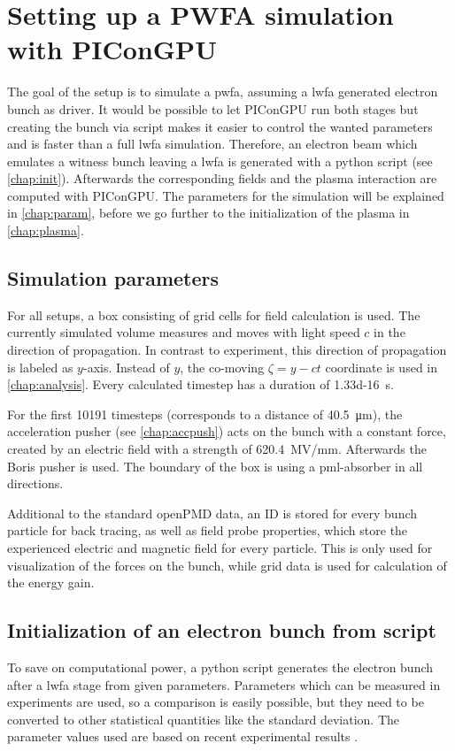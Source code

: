 \documentclass[bachelor_thesis]{subfiles}
\begin{document}
\chapter{Setting up a PWFA simulation with PIConGPU}\label{chap:setup}
The goal of the setup is to simulate a \gls{pwfa}, assuming a \gls{lwfa} generated electron bunch as driver. It would be possible to let PIConGPU run both stages but creating the bunch via script makes it easier to control the wanted parameters and is faster than a full \gls{lwfa} simulation.
Therefore, an electron beam which emulates a witness bunch leaving a \gls{lwfa} is generated with a python script (see \autoref{chap:init}). Afterwards the corresponding fields and the plasma interaction are computed with PIConGPU. 
The parameters for the simulation will be explained in \autoref{chap:param}, before we go further to the initialization of the plasma in \autoref{chap:plasma}.


\section{Simulation parameters}\label{chap:param}
For all setups, a box consisting of  grid cells for field calculation is used. The currently simulated volume measures  and moves with light speed $c$ in the direction of propagation.
In contrast to experiment, this direction of propagation is labeled as $y$-axis. Instead of $y$, the co-moving $\zeta=y-ct$ coordinate is used in \autoref{chap:analysis}.
Every calculated timestep has a duration of \qty{1.33d-16}{\s}. 

For the first \num{10191} timesteps (corresponds to a distance of \qty{40.5}{\um}), the acceleration pusher (see \autoref{chap:accpush}) acts on the bunch with a constant force, 
created by an electric field with a strength of \qty{620.4}{\mega\volt/\mm}. Afterwards the Boris pusher is used. 
The boundary of the box is using a \gls{pml}-absorber in all directions. 

Additional to the standard openPMD data, an ID is stored for every bunch particle for back tracing, as well as field probe properties, which store the experienced electric and magnetic field for every particle. 
This is only used for visualization of the forces on the bunch, while grid data is used for calculation of the energy gain.


\section{Initialization of an electron bunch from script}\label{chap:init}
To save on computational power, a python script generates the electron bunch after a \gls{lwfa} stage from given parameters. Parameters which can be measured in experiments are used,
so a comparison is easily possible, but they need to be converted to other statistical quantities like the standard deviation. The parameter values used are based on recent experimental results \cite{Kurz2021, Schoebel2022, Cabadag2021}.
\end{document}
